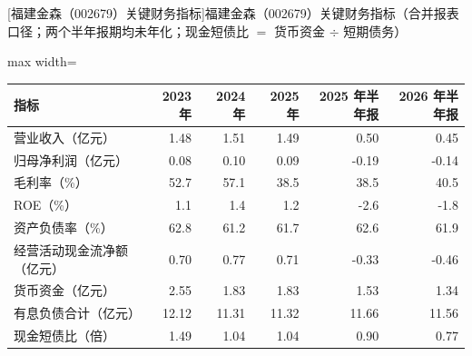 \begin{center}\small\setlength{\tabcolsep}{3.4pt}
[福建金森（002679）关键财务指标]{福建金森（002679）关键财务指标（合并报表口径；两个半年报期均未年化；现金短债比 $=$ 货币资金 $\div$ 短期债务）}
\begin{adjustbox}{max width=\textwidth}
\begin{tabular}{@{}lrrrrr@{}}
\toprule
指标 & 2023 年 & 2024 年 & 2025 年 & 2025 年半年报 & 2026 年半年报 \\
\midrule
营业收入（亿元） & 1.48 & 1.51 & 1.49 & 0.50 & 0.45 \\
归母净利润（亿元） & 0.08 & 0.10 & 0.09 & -0.19 & -0.14 \\
毛利率（\%） & 52.7 & 57.1 & 38.5 & 38.5 & 40.5 \\
ROE（\%） & 1.1 & 1.4 & 1.2 & -2.6 & -1.8 \\
资产负债率（\%） & 62.8 & 61.2 & 61.7 & 62.6 & 61.9 \\
经营活动现金流净额（亿元） & 0.70 & 0.77 & 0.71 & -0.33 & -0.46 \\
货币资金（亿元） & 2.55 & 1.83 & 1.83 & 1.53 & 1.34 \\
有息负债合计（亿元） & 12.12 & 11.31 & 11.32 & 11.66 & 11.56 \\
现金短债比（倍） & 1.49 & 1.04 & 1.04 & 0.90 & 0.77 \\
\bottomrule
\end{tabular}
\end{adjustbox}
\end{center}

